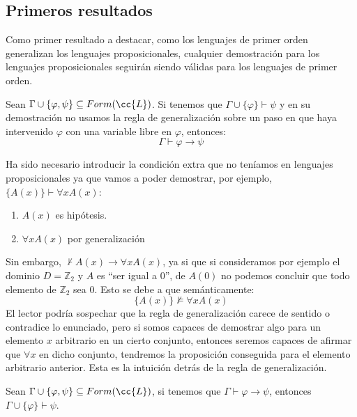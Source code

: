 \subsection{Primeros resultados}
Como primer resultado a destacar, como los lenguajes de primer orden generalizan los lenguajes proposicionales, cualquier demostración para los lenguajes proposicionales seguirán siendo válidas para los lenguajes de primer orden.

\begin{teo}[de la Deducción]
    Sean $\Gamma\cup\{\varphi,\psi\}\subseteq Form(\cc{L})$. Si tenemos que $\Gamma\cup\{\varphi\}\vdash  \psi$ y en su demostración no usamos la regla de generalización sobre un paso en que haya intervenido $\varphi$ con una variable libre en $\varphi$, entonces:
    \begin{equation*}
        \Gamma\vdash \varphi\to\psi
    \end{equation*}
\end{teo}

\begin{observacion}
    Ha sido necesario introducir la condición extra que no teníamos en lenguajes proposicionales ya que vamos a poder demostrar, por ejemplo, ${\{A(x)\}\vdash \forall xA(x)}$:
    \begin{enumerate}
        \item $A(x)$ es hipótesis.
        \item $\forall xA(x)$ por generalización
    \end{enumerate}
    Sin embargo, $\nvdash A(x)\to \forall xA(x)$, ya si que si consideramos por ejemplo el dominio $D=\mathbb{Z}_2$ y $A$ es ``ser igual a 0'', de $A(0)$ no podemos concluir que todo elemento de $\mathbb{Z}_2$ sea $0$. Esto se debe a que semánticamente:
    \begin{equation*}
        \{A(x)\} \nvDash \forall xA(x)
    \end{equation*}
    El lector podría sospechar que la regla de generalización carece de sentido o contradice lo enunciado, pero si somos capaces de demostrar algo para un elemento $x$ arbitrario en un cierto conjunto, entonces seremos capaces de afirmar que $\forall x$ en dicho conjunto, tendremos la proposición conseguida para el elemento arbitrario anterior. Esta es la intuición detrás de la regla de generalización.
\end{observacion}

\begin{prop}
    Sean $\Gamma\cup\{\varphi,\psi\}\subseteq Form(\cc{L})$, si tenemos que $\Gamma\vdash \varphi\to\psi$, entonces $\Gamma\cup\{\varphi\}\vdash \psi$.
\end{prop}

